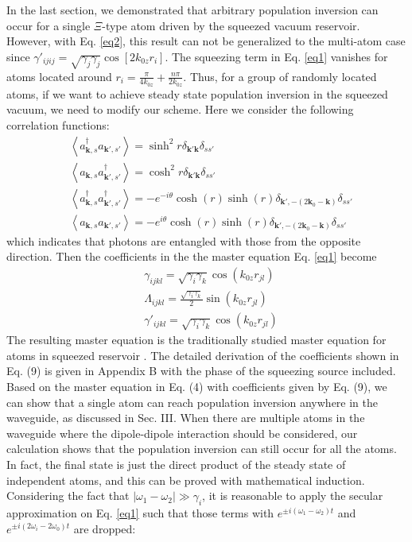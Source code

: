 \documentclass[aps,showpacs,twocolumn,twoside,groupedaddress]{revtex4}
\let\vec\bm
\begin{document}
In the last section, we demonstrated that arbitrary population inversion can occur for a single $\Xi$-type atom driven by the squeezed vacuum reservoir. However, with Eq.  \eqref{eq2}, this result can not be generalized to the multi-atom case since $\gamma'_{ijij}=\sqrt{\gamma_{j}\gamma_{j}}\cos[2k_{0z}r_{i}]$. The squeezing term in Eq. \eqref{eq1} vanishes for atoms located around $r_i=\frac{\pi}{4k_{0z}}+\frac{n\pi}{2k_{0z}}$. Thus, for a group of randomly located atoms, if we want to achieve steady state population inversion in the squeezed vacuum, we need to modify our scheme. Here we consider the following correlation functions:
\begin{equation}
\label{eq0b}
\begin{split}
& \left\langle a_{\vec{k},s}^{\dagger}a_{\vec{k}',s'}\right\rangle =\sinh^{2}r\delta_{\vec{k}'\vec{k}}\delta_{ss'} \\
& \left\langle a_{\vec{k},s}a_{\vec{k}',s'}^{\dagger}\right\rangle =\cosh^{2}r\delta_{\vec{k}'\vec{k}}\delta_{ss'}\\
& \left\langle a_{\vec{k},s}^{\dagger}a_{\vec{k}',s'}^{\dagger}\right\rangle =-e^{-i\theta}\cosh(r)\sinh(r)\delta_{\vec{k}',-(2\vec{k}_{0}-\vec{k})}\delta_{ss'}\\
&\left\langle a_{\vec{k},s}a_{\vec{k}',s'}\right\rangle =-e^{i\theta}\cosh(r)\sinh(r)\delta_{\vec{k}',-(2\vec{k}_{0}-\vec{k})}\delta_{ss'}
\end{split}
\end{equation}
which indicates that photons are entangled with those from the opposite direction. Then the coefficients in the the master equation Eq.  \eqref{eq1} become
\begin{equation}
\label{eq2b}
\begin{split}
& \gamma_{ijkl}=\sqrt{\gamma_{i}\gamma_{k}}\cos(k_{0z}r_{jl}) \\
& \Lambda_{ijkl}=\frac{\sqrt{\gamma_{i}\gamma_{k}}}{2}\sin(k_{0z}r_{jl})\\
& \gamma'_{ijkl}=\sqrt{\gamma_{i}\gamma_{k}}\cos(k_{0z}r_{jl})
\end{split}
\end{equation}
The resulting master equation is the traditionally studied master equation for atoms in squeezed reservoir  \cite{tanas2004stationary}. The detailed derivation of the coefficients shown in Eq. (9) is given in Appendix B with the phase of the squeezing source included. Based on the master equation in Eq. (4) with coefficients given by Eq. (9), we can show that a single atom can reach population inversion anywhere in the waveguide, as discussed in Sec. III. When there are multiple atoms in the waveguide where the dipole-dipole interaction should be considered, our calculation shows that the population inversion can still occur for all the atoms. In fact, the final state is just the direct product of the steady state of independent atoms, and this can be proved with mathematical induction. Considering the fact that $|\omega_1-\omega_2|\gg \gamma_i$, it is reasonable to apply the secular approximation on Eq. \eqref{eq1} such that those terms with $e^{\pm i(\omega_1-\omega_2)t}$ and $e^{\pm i(2\omega_i-2\omega_0)t}$ are dropped: 
\end{document}
